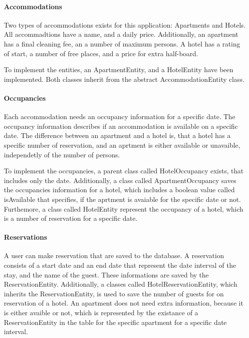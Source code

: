 \paragraph{Accommodations}
Two types of accommodations exists for this application: Apartments and Hotels. 
All accommadtions have a name, and a daily price. Additionally, an apartment has a final cleaning fee, an a number of maximum persons. A hotel has a rating of start, a number of free places, and a price for extra half-board.

To implement the entities, an ApartmentEntity, and a HotelEntity have been implemented. Both classes inherit from the abstract AccommodationEntity class.


\paragraph{Occupancies}
Each accommodation needs an occupancy information for a specific date. The occupancy information describes if an accommodation is available on a specific date. The difference between an apartment and a hotel is, that a hotel has a specific number of reservation, and an aprtment is either available or unavaible, independetly of the number of persons.

To implement the occupancies, a parent class called HotelOccupancy exists, that includes only the date. Additionally, a class called ApartmentOccupancy saves the occupancies information for a hotel, which includes a boolean value called isAvailable that specifies, if the aprtment is avaiable for the specific date or not. Furthemore, a class called HotelEntity represent the occupancy of a hotel, which is a number of reservation for a specific date.


\paragraph{Reservations}
A user can make reservation that are saved to the database. A reservation consists of a start date and an end date that represent the date interval of the stay, and the name of the guest. These informations are saved by the ReservationEntity. Additionally, a classes called HotelReservationEntity, which inherits the ReservationEntity, is used to save the number of guests for on reservation of a hotel. An apartment does not need extra information, because it is either avaible or not, which is represented by the existance of a ReservationEntity in the table for the specific apartment for a specific date interval.


